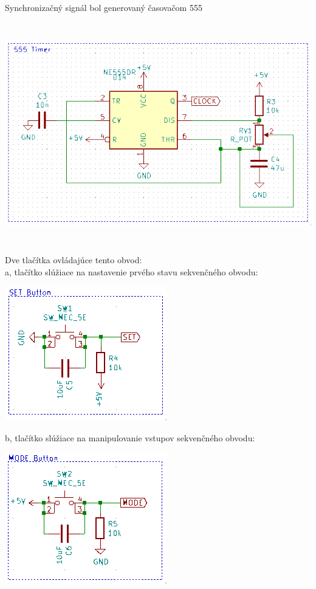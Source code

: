 \newpage
\noindent
Synchronizačný signál bol generovaný časovačom 555\\
\begin{center}
    \includegraphics[width=16.2cm, height=9.6cm]{images/timer.png}
\end{center}

\newpage
\noindent
Dve tlačítka ovládajúce tento obvod:\\
\noindent
a, tlačítko slúžiace na nastavenie prvého stavu sekvenčného obvodu:
\begin{center}
    \includegraphics{images/sw1.png}
\end{center}
\noindent
b, tlačítko slúžiace na manipulovanie vstupov sekvenčného obvodu:
\begin{center}
    \includegraphics{images/sw2.png}
\end{center}


